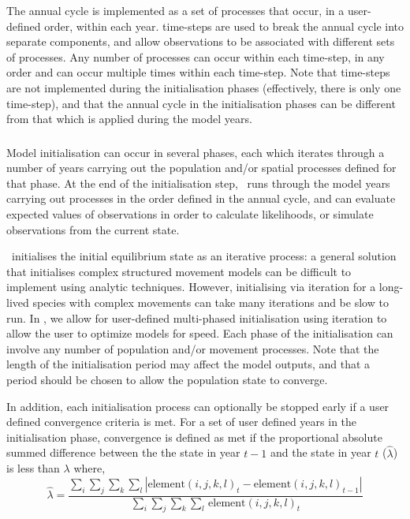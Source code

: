 The annual cycle is implemented as a set of processes that occur, in a user-defined order, within each year. time-steps are used to break the annual cycle into separate components, and allow observations to be associated with different sets of processes. Any number of processes can occur within each time-step, in any order and can occur multiple times within each time-step. Note that time-steps are not implemented during the initialisation phases (effectively, there is only one time-step), and that the annual cycle in the initialisation phases can be different from that which is applied during the model years.

\subsubsection{}

Model initialisation can occur in several phases, each which iterates through a number of years carrying out the population and/or spatial processes defined for that phase. At the end of the initialisation step, \SPM\ runs through the model years carrying out processes in the order defined in the annual cycle, and can evaluate expected values of observations in order to calculate likelihoods, %
or simulate observations from the current state.

\SPM\ initialises the initial equilibrium state as an iterative process: a general solution that initialises complex structured movement models can be difficult to implement using analytic techniques. However, initialising via iteration for a long-lived species with complex movements can take many iterations and be slow to run. In \SPM, we allow for user-defined multi-phased initialisation using iteration to allow the user to optimize models for speed. Each phase of the initialisation can involve any number of population and/or movement processes. Note that the length of the initialisation period may affect the model outputs, and that a period should be chosen to allow the population state to converge.

In addition, each initialisation process can optionally be stopped early if a user defined convergence criteria is met. For a set of user defined years in the initialisation phase, convergence is defined as met if the proportional absolute summed difference between the the state in year $t-1$ and the state in year $t$ ($\widehat{\lambda}$) is less than $\lambda$ where, 
\begin{equation}
  \widehat{\lambda} = \frac{\sum\limits_{i} \sum\limits_{j} \sum\limits_{k} \sum\limits_l \left|\text{element}(i,j,k,l)_t - \text{element}(i,j,k,l)_{t-1} \right|}{\sum\limits_{i} \sum\limits_{j} \sum\limits_{k} \sum\limits_l \frac{}{}\text{element}(i,j,k,l)_t}
\end{equation}

